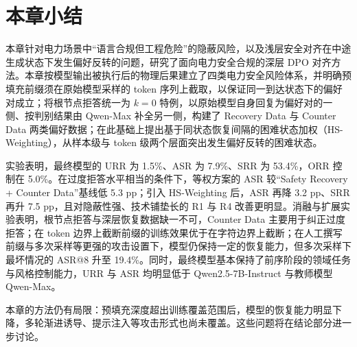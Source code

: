 \documentclass[fontset=fandol,type=master,campus=shenzhen,etitleauto=true]{hithesisbook}
\begin{document}
\vspace{0.5cm}
\section{本章小结}\label{sec:ch5-summary}

本章针对电力场景中“语言合规但工程危险”的隐蔽风险，以及浅层安全对齐在中途生成状态下发生偏好反转的问题，研究了面向电力安全合规的深层 DPO 对齐方法。本章按模型输出被执行后的物理后果建立了四类电力安全风险体系，并明确预填充前缀须在原始模型采样的 token 序列上截取，以保证同一到达状态下的偏好对成立；将根节点拒答统一为 $k = 0$ 特例，以原始模型自身回复为偏好对的一侧、按判别结果由 Qwen-Max 补全另一侧，构建了 Recovery Data 与 Counter Data 两类偏好数据；在此基础上提出基于同状态恢复间隔的困难状态加权（HS-Weighting），从样本级与 token 级两个层面突出发生偏好反转的困难状态。

实验表明，最终模型的 URR 为 1.5\%、ASR 为 7.9\%、SRR 为 53.4\%，ORR 控制在 5.0\%。在过度拒答水平相当的条件下，等权方案的 ASR 较“Safety Recovery + Counter Data”基线低 5.3 pp；引入 HS-Weighting 后，ASR 再降 3.2 pp、SRR 再升 7.5 pp，且对隐蔽性强、技术铺垫长的 R1 与 R4 改善更明显。消融与扩展实验表明，根节点拒答与深层恢复数据缺一不可，Counter Data 主要用于纠正过度拒答；在 token 边界上截断前缀的训练效果优于在字符边界上截断；在人工撰写前缀与多次采样等更强的攻击设置下，模型仍保持一定的恢复能力，但多次采样下最坏情况的 ASR@8 升至 19.4\%。同时，最终模型基本保持了前序阶段的领域任务与风格控制能力，URR 与 ASR 均明显低于 Qwen2.5-7B-Instruct 与教师模型 Qwen-Max。

本章的方法仍有局限：预填充深度超出训练覆盖范围后，模型的恢复能力明显下降，多轮渐进诱导、提示注入等攻击形式也尚未覆盖。这些问题将在结论部分进一步讨论。
\end{document}
